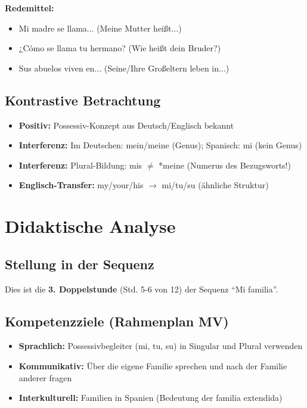 \documentclass[11pt,a4paper]{article}
\newcommand{\reihenthema}{Mi familia}
\begin{document}
\textbf{Redemittel:}
\begin{itemize}
    \item Mi madre se llama... (Meine Mutter heißt...)
    \item ¿Cómo se llama tu hermano? (Wie heißt dein Bruder?)
    \item Sus abuelos viven en... (Seine/Ihre Großeltern leben in...)
\end{itemize}

\subsection{Kontrastive Betrachtung}
\begin{itemize}
    \item \textbf{Positiv:} Possessiv-Konzept aus Deutsch/Englisch bekannt
    \item \textbf{Interferenz:} Im Deutschen: mein/meine (Genus); Spanisch: mi (kein Genus)
    \item \textbf{Interferenz:} Plural-Bildung: mis $\neq$ *meine (Numerus des Bezugsworts!)
    \item \textbf{Englisch-Transfer:} my/your/his $\rightarrow$ mi/tu/su (ähnliche Struktur)
\end{itemize}

\section{Didaktische Analyse}

\subsection{Stellung in der Sequenz}
Dies ist die \textbf{3. Doppelstunde} (Std. 5-6 von 12) der Sequenz ``\reihenthema''.

\subsection{Kompetenzziele (Rahmenplan MV)}
\begin{itemize}
    \item \textbf{Sprachlich:} Possessivbegleiter (mi, tu, su) in Singular und Plural verwenden
    \item \textbf{Kommunikativ:} Über die eigene Familie sprechen und nach der Familie anderer fragen
    \item \textbf{Interkulturell:} Familien in Spanien (Bedeutung der familia extendida)
\end{itemize}
\end{document}
